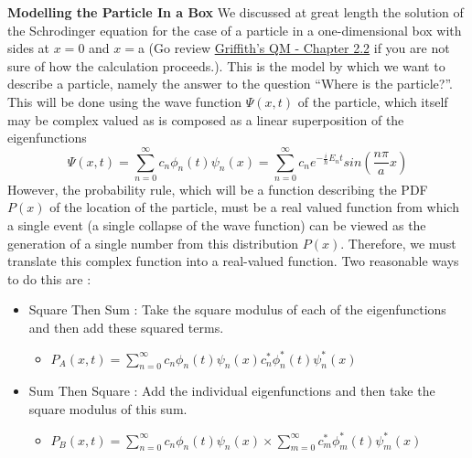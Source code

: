 \documentclass[12pt]{article}
\begin{document}
\textbf{Modelling the Particle In a Box} 
\newline
We discussed at great length the solution of the Schrodinger equation for the case of a particle in a one-dimensional box with sides at $x=$0 and $x=$a (Go review \href{http://www.fisica.net/mecanica-quantica/Griffiths\%20-\%20Introduction\%20to\%20quantum\%20mechanics.pdf}{Griffith's QM - Chapter 2.2} if you are not sure of how the calculation proceeds.).  This is the model by which we want to describe a particle, namely the answer to the question ``Where is the particle?''.  This will be done using the wave function $\Psi(x,t)$ of the particle, which itself may be complex valued as is composed as a linear superposition of the eigenfunctions 
\begin{displaymath}
 \Psi(x,t)=\displaystyle\sum_{n=0}^{\infty} c_{n}  \phi_{n}(t)  \psi_{n}(x) = \displaystyle\sum_{n=0}^{\infty} c_{n}  e^{-\frac{i}{\hbar}E_{n}t} sin(\frac{n\pi}{a}x)
\end{displaymath}
However, the probability rule, which will be a function describing the PDF $P(x)$ of the location of the particle, must be a real valued function from which a single event (a single collapse of the wave function) can be viewed as the generation of a single number from this distribution $P(x)$.  Therefore, we must translate this complex function into a real-valued function.  Two reasonable ways to do this are :
\begin{itemize}
\item Square Then Sum : Take the square modulus of each of the eigenfunctions and then add these squared terms.
   \begin{itemize}
     \item $P_{A}(x,t)=\displaystyle\sum_{n=0}^{\infty}  c_{n}  \phi_{n}(t)  \psi_{n}(x) c_{n}^{*}  \phi_{n}^{*}(t)  \psi_{n}^{*}(x) $
   \end{itemize}
\item Sum Then Square : Add the individual eigenfunctions and then take the square modulus of this sum.
   \begin{itemize}
     \item $P_{B}(x,t)=\displaystyle\sum_{n=0}^{\infty}  c_{n}  \phi_{n}(t)  \psi_{n}(x) \times \displaystyle\sum_{m=0}^{\infty}  c_{m}^{*}  \phi_{m}^{*}(t)  \psi_{m}^{*}(x)$
   \end{itemize}
\end{itemize}
\end{document}
